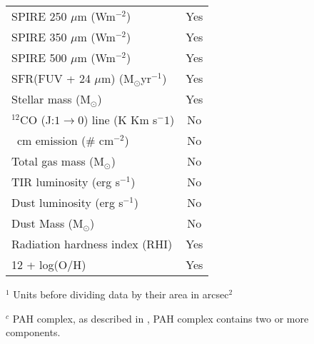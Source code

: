\begin{table}
\begin{tabular}{ |l|c| }
SPIRE 250 $\mu$m (Wm$^{-2}$)& Yes\\
SPIRE 350 $\mu$m (Wm$^{-2}$)& Yes\\
SPIRE 500 $\mu$m (Wm$^{-2}$)& Yes\\
SFR(FUV + 24 $\mu$m) (M$_{\odot}$yr$^{-1}$) & Yes\\
Stellar mass (M$_{\odot}$)& Yes\\
$^{12}$CO (J:$1\rightarrow0$) line (K Km s$^-1$) & No \\
\hi 21~cm emission ($\#$ cm$^{-2}$) & No \\
Total gas mass (M$_{\odot}$) & No \\
TIR luminosity (erg s$^{-1}$) & No \\
Dust luminosity (erg s$^{-1}$) & No \\
Dust Mass (M$_{\odot}$)& No\\
Radiation hardness index (RHI) & Yes\\
12 + log(O/H)& Yes\\
\hline
\end{tabular}
\begin{tablenotes}
\small
\item $^1$ Units before dividing data by their area in arcsec$^{2}$
\item $^c$ PAH complex, as described in \cite{Smith07a}, PAH complex contains two or more components.
\end{tablenotes}
\end{table}